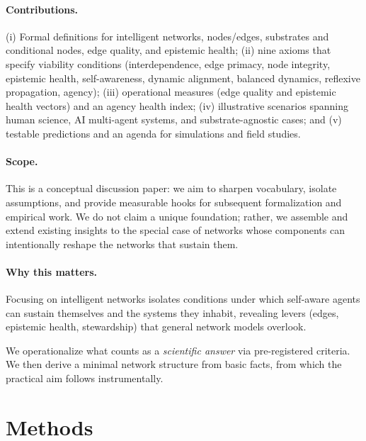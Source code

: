\documentclass[12pt]{article}
\begin{document}
\paragraph{Contributions.} (i) Formal definitions for intelligent networks, nodes/edges, substrates and conditional nodes, edge quality, and epistemic health; (ii) nine axioms that specify viability conditions (interdependence, edge primacy, node integrity, epistemic health, self-awareness, dynamic alignment, balanced dynamics, reflexive propagation, agency); (iii) operational measures (edge quality and epistemic health vectors) and an agency health index; (iv) illustrative scenarios spanning human science, AI multi-agent systems, and substrate-agnostic cases; and (v) testable predictions and an agenda for simulations and field studies.

\paragraph{Scope.} This is a conceptual discussion paper: we aim to sharpen vocabulary, isolate assumptions, and provide measurable hooks for subsequent formalization and empirical work. We do not claim a unique foundation; rather, we assemble and extend existing insights to the special case of networks whose components can intentionally reshape the networks that sustain them.

\paragraph{Why this matters.} Focusing on intelligent networks isolates conditions under which self-aware agents can sustain themselves and the systems they inhabit, revealing levers (edges, epistemic health, stewardship) that general network models overlook.

\par\smallskip
We operationalize what counts as a \emph{scientific answer} via pre-registered criteria. We then derive a minimal network structure from basic facts, from which the practical aim follows instrumentally.

\section{Methods}
\end{document}
